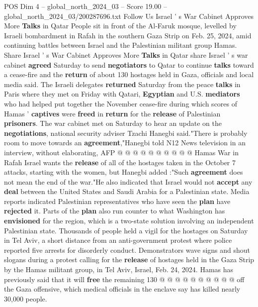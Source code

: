 \begin{textsample}{POS Dim 4 – global\_north\_2024\_03 – Score 19.00 – global\_north\_2024\_03/200287696.txt}  \label{ex:f4_pos_240}
Follow Us Israel ' s War Cabinet Approves More \textbf{Talks} in Qatar People sit in front of the Al-Faruk mosque, levelled by Israeli bombardment in Rafah in the southern Gaza Strip on Feb. 25, 2024, amid continuing battles between Israel and the Palestinian militant group Hamas.
Share Israel ' s War Cabinet Approves More \textbf{Talks} in Qatar share Israel ' s war cabinet \textbf{agreed} Saturday to send \textbf{negotiators} to Qatar to continue \textbf{talks} toward a cease-fire and the \textbf{return} of about 130 hostages held in Gaza, officials and local media said.
The Israeli delegates \textbf{returned} Saturday from the peace \textbf{talks} in Paris where they met on Friday with Qatari, \textbf{Egyptian} and U.S. \textbf{mediators} who had helped put together the November cease-fire during which scores of Hamas ' \textbf{captives} were \textbf{freed} in \textbf{return} for the \textbf{release} of Palestinian \textbf{prisoners}.
The war cabinet met on Saturday to hear an update on the \textbf{negotiations}, national security adviser Tzachi Hanegbi said."There is probably room to move towards an \textbf{agreement},"Hanegbi told N12 News television in an interview, without elaborating, AFP @ @ @ @ @ @ @ @ @ @ Hamas War in Rafah Israel wants the \textbf{release} of all of the hostages taken in the October 7 attacks, starting with the women, but Hanegbi added :"Such \textbf{agreement} does not mean the end of the war."He also indicated that Israel would not \textbf{accept} any \textbf{deal} between the United States and Saudi Arabia for a Palestinian state.
Media reports indicated Palestinian representatives who have seen the \textbf{plan} have \textbf{rejected} it.
Parts of the \textbf{plan} also run counter to what Washington has \textbf{envisioned} for the region, which is a two-state solution involving an independent Palestinian state.
Thousands of people held a vigil for the hostages on Saturday in Tel Aviv, a short distance from an anti-government protest where police reported five arrests for disorderly conduct.
Demonstrators wave signs and shout slogans during a protest calling for the \textbf{release} of hostages held in the Gaza Strip by the Hamas militant group, in Tel Aviv, Israel, Feb. 24, 2024.
Hamas has previously said that it will \textbf{free} the remaining 130 @ @ @ @ @ @ @ @ @ @ off the Gaza offensive, which medical officials in the enclave say has killed nearly 30,000 people.

\end{textsample}
